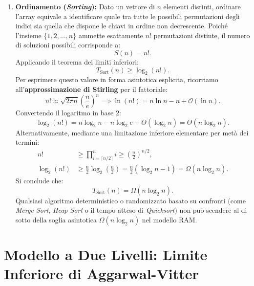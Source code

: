 \begin{enumerate}
  \item \textbf{Ordinamento (\textit{Sorting}):}
  Dato un vettore di $n$ elementi distinti, ordinare l'array equivale a identificare quale tra tutte le possibili permutazioni degli indici sia quella che dispone le chiavi in ordine non decrescente. Poiché l'insieme $\{1, 2, \dots, n\}$ ammette esattamente $n!$ permutazioni distinte, il numero di soluzioni possibili corrisponde a:
  \begin{equation}
    S(n) = n!.
  \end{equation}
  Applicando il teorema dei limiti inferiori:
  \begin{equation}
    T_{\text{Sort}}(n) \ge \log_2(n!).
  \end{equation}
  Per esprimere questo valore in forma asintotica esplicita, ricorriamo all'\textbf{approssimazione di Stirling} per il fattoriale:
  \begin{equation}
    n! \approx \sqrt{2\pi n} \left(\frac{n}{e}\right)^n \implies \ln(n!) = n \ln n - n + \mathcal{O}(\ln n).
  \end{equation}
  Convertendo il logaritmo in base $2$:
  \begin{equation}
    \log_2(n!) = n \log_2 n - n \log_2 e + \Theta(\log_2 n) = \Theta(n \log_2 n).
  \end{equation}
  Alternativamente, mediante una limitazione inferiore elementare per metà dei termini:
  \begin{align}
    n! &\ge \prod_{i = \lceil n/2 \rceil}^{n} i \ge \left(\frac{n}{2}\right)^{n/2}, \\
    \log_2(n!) &\ge \frac{n}{2} \log_2\left(\frac{n}{2}\right) = \frac{n}{2}(\log_2 n - 1) = \Omega(n \log_2 n).
  \end{align}
  Si conclude che:
  \begin{equation}
    T_{\text{Sort}}(n) = \Omega(n \log_2 n).
  \end{equation}
  Qualsiasi algoritmo deterministico o randomizzato basato su confronti (come \textit{Merge Sort}, \textit{Heap Sort} o il tempo atteso di \textit{Quicksort}) non può scendere al di sotto della soglia asintotica $\Omega(n \log_2 n)$ nel modello RAM.
\end{enumerate}

\FloatBarrier
\section{Modello a Due Livelli: Limite Inferiore di Aggarwal-Vitter}
\label{sec:aggarwal-vitter-lower-bound}

